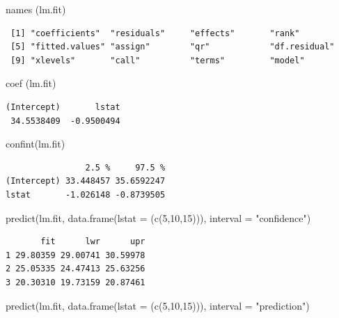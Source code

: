 \documentclass[
  letterpaper,
  DIV=11,
  numbers=noendperiod]{scrartcl}
\newenvironment{Shaded}{\begin{snugshade}}{\end{snugshade}}
\newcommand{\AttributeTok}[1]{\textcolor[rgb]{0.40,0.45,0.13}{#1}}
\newcommand{\DecValTok}[1]{\textcolor[rgb]{0.68,0.00,0.00}{#1}}
\newcommand{\FunctionTok}[1]{\textcolor[rgb]{0.28,0.35,0.67}{#1}}
\newcommand{\NormalTok}[1]{\textcolor[rgb]{0.00,0.23,0.31}{#1}}
\newcommand{\StringTok}[1]{\textcolor[rgb]{0.13,0.47,0.30}{#1}}
\begin{document}
\begin{Shaded}
\begin{Highlighting}[]
\FunctionTok{names}\NormalTok{ (lm.fit)}
\end{Highlighting}
\end{Shaded}

\begin{verbatim}
 [1] "coefficients"  "residuals"     "effects"       "rank"         
 [5] "fitted.values" "assign"        "qr"            "df.residual"  
 [9] "xlevels"       "call"          "terms"         "model"        
\end{verbatim}

\begin{Shaded}
\begin{Highlighting}[]
\FunctionTok{coef}\NormalTok{ (lm.fit)}
\end{Highlighting}
\end{Shaded}

\begin{verbatim}
(Intercept)       lstat 
 34.5538409  -0.9500494 
\end{verbatim}

\begin{Shaded}
\begin{Highlighting}[]
\FunctionTok{confint}\NormalTok{(lm.fit)}
\end{Highlighting}
\end{Shaded}

\begin{verbatim}
                2.5 %     97.5 %
(Intercept) 33.448457 35.6592247
lstat       -1.026148 -0.8739505
\end{verbatim}

\begin{Shaded}
\begin{Highlighting}[]
\FunctionTok{predict}\NormalTok{(lm.fit, }\FunctionTok{data.frame}\NormalTok{(}\AttributeTok{lstat =}\NormalTok{ (}\FunctionTok{c}\NormalTok{(}\DecValTok{5}\NormalTok{,}\DecValTok{10}\NormalTok{,}\DecValTok{15}\NormalTok{))),}
        \AttributeTok{interval =} \StringTok{"confidence"}\NormalTok{)}
\end{Highlighting}
\end{Shaded}

\begin{verbatim}
       fit      lwr      upr
1 29.80359 29.00741 30.59978
2 25.05335 24.47413 25.63256
3 20.30310 19.73159 20.87461
\end{verbatim}

\begin{Shaded}
\begin{Highlighting}[]
\FunctionTok{predict}\NormalTok{(lm.fit, }\FunctionTok{data.frame}\NormalTok{(}\AttributeTok{lstat =}\NormalTok{ (}\FunctionTok{c}\NormalTok{(}\DecValTok{5}\NormalTok{,}\DecValTok{10}\NormalTok{,}\DecValTok{15}\NormalTok{))),}
        \AttributeTok{interval =} \StringTok{"prediction"}\NormalTok{)}
\end{Highlighting}
\end{Shaded}
\end{document}
